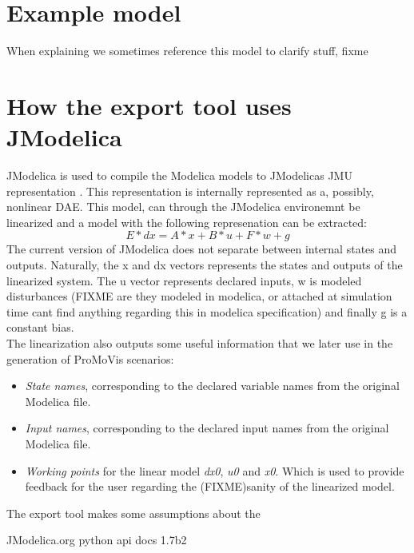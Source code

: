 \documentclass{report}
\begin{document}
\section{Example model}
When explaining we sometimes reference this model to clarify stuff, fixme
%

\section{How the export tool uses JModelica}
JModelica is used to compile the Modelica models to JModelicas JMU representation \cite{PythonAPI}. This representation is internally represented as a, possibly, nonlinear DAE. This model, can through the JModelica environemnt be linearized and a model with the following represenation can be extracted:
\begin{equation}
E*dx = A*x + B*u + F*w + g
\end{equation}
The current version of JModelica\cite{JModelicaVer} does not separate between internal states and outputs. Naturally, the x and dx vectors represents the states and outputs of the linearized system. The u vector represents declared inputs, w is modeled disturbances (FIXME are they modeled in modelica, or attached at simulation time cant find anything regarding this in modelica specification) and finally g is a constant bias.\\The linearization also outputs some useful information that we later use in the generation of ProMoVis scenarios:
\begin{itemize}
\item \textit{State names}, corresponding to the declared variable names from the original Modelica file.
\item \textit{Input names}, corresponding to the declared input names from the original Modelica file.
\item \textit{Working points} for the linear model \textit{dx0}, \textit{u0} and \textit{x0}. Which is used to provide feedback for the user regarding the (FIXME)sanity of the linearized model.
\end{itemize}

The export tool makes some assumptions about the 
\begin{thebibliography}{99}
 JModelica.org python api docs 
 1.7b2
\end{thebibliography}

\printindex
\end{document}
